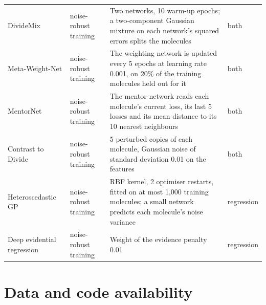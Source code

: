 {\begin{longtable}{@{}p{2.9cm}p{2.0cm}p{7.3cm}p{1.6cm}@{}}
DivideMix & noise-robust training & Two networks, 10 warm-up epochs; a two-component Gaussian mixture on each network's squared errors splits the molecules & both \\
Meta-Weight-Net & noise-robust training & The weighting network is updated every 5 epochs at learning rate 0.001, on 20\% of the training molecules held out for it & both \\
MentorNet & noise-robust training & The mentor network reads each molecule's current loss, its last 5 losses and its mean distance to its 10 nearest neighbours & both \\
Contrast to Divide & noise-robust training & 5 perturbed copies of each molecule, Gaussian noise of standard deviation 0.01 on the features & both \\
\midrule
Heteroscedastic GP & noise-robust training & RBF kernel, 2 optimiser restarts, fitted on at most 1{,}000 training molecules; a small network predicts each molecule's noise variance & regression \\
Deep evidential regression & noise-robust training & Weight of the evidence penalty 0.01 & regression \\
\bottomrule
\end{longtable}
}

\chapter{Data and code availability}\label{app:availability}

